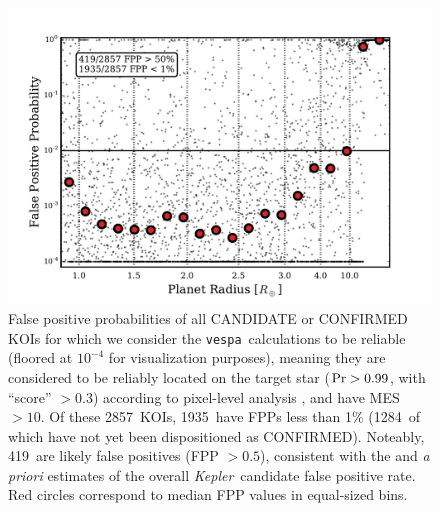 \documentclass{emulateapj}
\newcommand{\figlabel}[1]{\label{fig:#1}}
\newcommand{\nreliable}{2857} %
\newcommand{\nval}{1935} %
\newcommand{\nreliableFP}{419} %
\newcommand{\nvalnew}{1284} %
\newcommand{\posprobthresh}{0.3}
\newcommand{\kepler}{\textit{Kepler}}
\newcommand{\vespa}{\texttt{vespa}}
\begin{document}
\begin{figure}[p]
\begin{center}
\includegraphics[width=7in]{figures/fpp_summary_all.pdf}
\end{center}
\caption{False positive probabilities of all CANDIDATE or CONFIRMED
  KOIs for which we consider the \vespa\ calculations to be reliable
  (floored at $10^{-4}$ for visualization purposes), meaning they are
  considered to be reliably located on the target star ($ {\rm Pr} >
  0.99$, with ``score'' $> \posprobthresh$) according to pixel-level analysis
  \citep{Bryson:KSCI}, and have MES $>10$.  Of these \nreliable\ KOIs,
  \nval\ have FPPs less than 1\% (\nvalnew\ of which have not yet been
  dispositioned as CONFIRMED).  Noteably, \nreliableFP\ are likely
  false positives (FPP $> 0.5$), consistent with the
  \citet{Morton:2011b} and \citet{Fressin:2013} \emph{a priori}
  estimates of the overall \kepler\ candidate false positive rate.
  Red circles correspond to median FPP values in equal-sized bins. 
  \figlabel{fppall}}
\end{figure}
\end{document}
